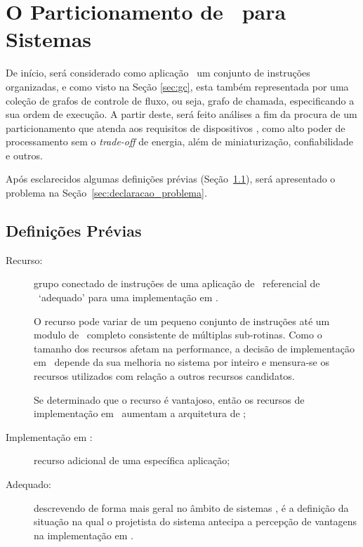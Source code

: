    \section{O Particionamento de \HS\ para Sistemas \Wearable} \label{sec:desenvolvimento}

      De início, será considerado como aplicação \wearable\ um conjunto de instruções organizadas, e como visto na Seção \ref{sec:gc}, esta também representada por uma coleção de grafos de controle de fluxo, ou seja, grafo de chamada, especificando a sua ordem de execução.
      A partir deste, será feito análises a fim da procura de um particionamento que atenda aos requisitos de dispositivos \wearables, como alto poder de processamento sem o \textit{trade-off} de energia, além de miniaturização, confiabilidade e outros.

      Após esclarecidos algumas definições prévias (Seção~\ref{sec:definicoes_previas}), será apresentado o problema na Seção~\ref{sec:declaracao_problema}.

      \subsection{Definições Prévias} \label{sec:definicoes_previas}
         \begin{description}
            \item [Recurso:] grupo conectado de instruções de uma aplicação de \design\ referencial de \software\ `adequado' para uma implementação em \hardware.

            O recurso pode variar de um pequeno conjunto de instruções até um modulo de \software\ completo consistente de múltiplas sub-rotinas.
            Como o tamanho dos recursos afetam na performance, a decisão de implementação em \hardware\ depende da sua melhoria no sistema por inteiro e mensura-se os recursos utilizados com relação a outros recursos candidatos.

            Se determinado que o recurso é vantajoso, então os recursos de implementação em \hardware\ aumentam a arquitetura de \hardware;

            \item [Implementação em \hardware:] recurso adicional de uma específica aplicação;

            \item [Adequado:] descrevendo de forma mais geral no âmbito de sistemas \wearable, é a definição da situação na qual o projetista do sistema antecipa a percepção de vantagens na implementação em \hardware.
         \end{description}

